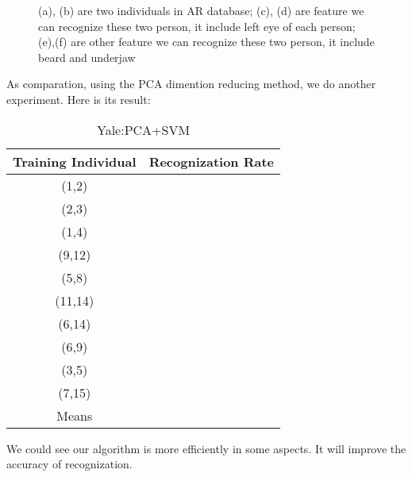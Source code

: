 \documentclass[10pt,journal,final,twocolumn,]{IEEEtran}
\begin{document}
    \begin{figure*}[!t]
		\centering
		\hfil	
		
		\caption{(a), (b) are two individuals in AR database; (c), (d) are feature we can recognize these two person, it include left eye of each person; (e),(f) are other feature we can recognize these two person, it include beard and underjaw}
		\label{fig 6}
    \end{figure*}
	
	As comparation, using the PCA dimention reducing method, we do another experiment. Here is its result:
	\begin{table}[h]
		\centering
		\caption{Yale:PCA+SVM}
		\begin{tabular}{c|c}
			\hline
			Training Individual  & Recognization Rate\\
			\hline
			(1,2)  & \qquad \\
			(2,3)  & \qquad \\
			(1,4)  & \qquad \\
			(9,12)  & \qquad \\
			(5,8)  & \qquad \\
			(11,14)  & \qquad \\
			(6,14)  & \qquad \\
			(6,9)  & \qquad \\
			(3,5)  & \qquad \\
			(7,15)& \qquad \\
			\hline
			Means  & \qquad \\
			\hline
		\end{tabular}
	\end{table}
	
	We could see our algorithm is more efficiently in some aspects. It will improve the accuracy of recognization.
	
	
\end{document}
